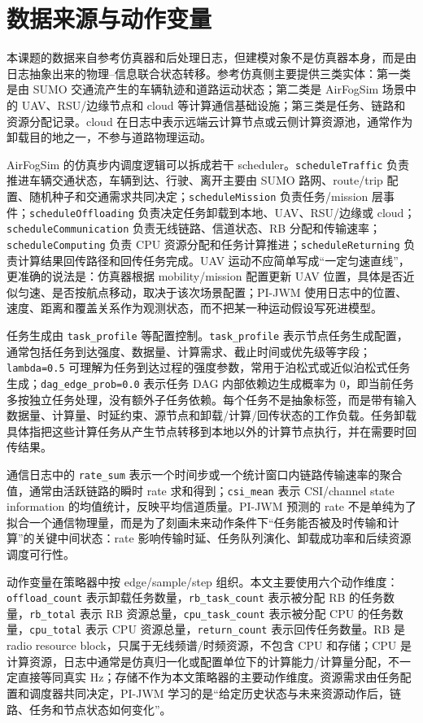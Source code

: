 \documentclass[letterpaper,journal]{IEEEtran}
\newcommand{\code}[1]{\texttt{#1}}
\begin{document}
\section{数据来源与动作变量}

本课题的数据来自参考仿真器和后处理日志，但建模对象不是仿真器本身，而是由日志抽象出来的物理--信息联合状态转移。参考仿真侧主要提供三类实体：第一类是由 SUMO 交通流产生的车辆轨迹和道路运动状态；第二类是 AirFogSim 场景中的 UAV、RSU/边缘节点和 cloud 等计算通信基础设施；第三类是任务、链路和资源分配记录。cloud 在日志中表示远端云计算节点或云侧计算资源池，通常作为卸载目的地之一，不参与道路物理运动。

AirFogSim 的仿真步内调度逻辑可以拆成若干 scheduler。\code{scheduleTraffic} 负责推进车辆交通状态，车辆到达、行驶、离开主要由 SUMO 路网、route/trip 配置、随机种子和交通需求共同决定；\code{scheduleMission} 负责任务/mission 层事件；\code{scheduleOffloading} 负责决定任务卸载到本地、UAV、RSU/边缘或 cloud；\code{scheduleCommunication} 负责无线链路、信道状态、RB 分配和传输速率；\code{scheduleComputing} 负责 CPU 资源分配和任务计算推进；\code{scheduleReturning} 负责计算结果回传路径和回传任务完成。UAV 运动不应简单写成“一定匀速直线”，更准确的说法是：仿真器根据 mobility/mission 配置更新 UAV 位置，具体是否近似匀速、是否按航点移动，取决于该次场景配置；PI-JWM 使用日志中的位置、速度、距离和覆盖关系作为观测状态，而不把某一种运动假设写死进模型。

任务生成由 \code{task\_profile} 等配置控制。\code{task\_profile} 表示节点任务生成配置，通常包括任务到达强度、数据量、计算需求、截止时间或优先级等字段；\code{lambda=0.5} 可理解为任务到达过程的强度参数，常用于泊松式或近似泊松式任务生成；\code{dag\_edge\_prob=0.0} 表示任务 DAG 内部依赖边生成概率为 0，即当前任务多按独立任务处理，没有额外子任务依赖。每个任务不是抽象标签，而是带有输入数据量、计算量、时延约束、源节点和卸载/计算/回传状态的工作负载。任务卸载具体指把这些计算任务从产生节点转移到本地以外的计算节点执行，并在需要时回传结果。

通信日志中的 \code{rate\_sum} 表示一个时间步或一个统计窗口内链路传输速率的聚合值，通常由活跃链路的瞬时 rate 求和得到；\code{csi\_mean} 表示 CSI/channel state information 的均值统计，反映平均信道质量。PI-JWM 预测的 rate 不是单纯为了拟合一个通信物理量，而是为了刻画未来动作条件下“任务能否被及时传输和计算”的关键中间状态：rate 影响传输时延、任务队列演化、卸载成功率和后续资源调度可行性。

动作变量在策略器中按 edge/sample/step 组织。本文主要使用六个动作维度：\code{offload\_count} 表示卸载任务数量，\code{rb\_task\_count} 表示被分配 RB 的任务数量，\code{rb\_total} 表示 RB 资源总量，\code{cpu\_task\_count} 表示被分配 CPU 的任务数量，\code{cpu\_total} 表示 CPU 资源总量，\code{return\_count} 表示回传任务数量。RB 是 radio resource block，只属于无线频谱/时频资源，不包含 CPU 和存储；CPU 是计算资源，日志中通常是仿真归一化或配置单位下的计算能力/计算量分配，不一定直接等同真实 Hz；存储不作为本文策略器的主要动作维度。资源需求由任务配置和调度器共同决定，PI-JWM 学习的是“给定历史状态与未来资源动作后，链路、任务和节点状态如何变化”。
\end{document}

